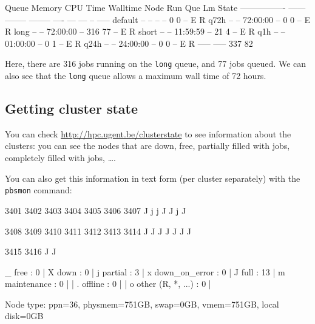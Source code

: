 \begin{prompt}
Queue            Memory CPU Time Walltime Node  Run Que Lm  State
---------------- ------ -------- -------- ----  --- --- --  -----
default            --      --       --      --    0   0 --   E R
q72h               --      --    72:00:00   --    0   0 --   E R
long               --      --    72:00:00   --  316  77 --   E R
short              --      --    11:59:59   --   21   4 --   E R
q1h                --      --    01:00:00   --    0   1 --   E R
q24h               --      --    24:00:00   --    0   0 --   E R
                                               ----- -----
                                                337  82
\end{prompt}

Here, there are 316 jobs running on the \lstinline|long| queue, and 77 jobs queued. We
can also see that the \lstinline|long| queue allows a maximum wall time of 72 hours.
\fi  %

\ifgent
\subsection{Getting cluster state}

You can check \url{http://hpc.ugent.be/clusterstate} to see information about
the clusters: you can see the nodes that are down, free, partially filled with jobs,
completely filled with jobs, \ldots.

You can also get this information in text form (per cluster separately) with
the \lstinline|pbsmon| command:


\begin{prompt}
 3401 3402 3403 3404 3405 3406 3407
    J    j    j    J    J    j    J

 3408 3409 3410 3411 3412 3413 3414
    J    J    J    J    J    J    J

 3415 3416
    J    J

   _ free                 : 0   |   X down                 : 0   |
   j partial              : 3   |   x down_on_error        : 0   |
   J full                 : 13  |   m maintenance          : 0   |
                                |   . offline              : 0   |
                                |   o other (R, *, ...)    : 0   |

Node type:
 ppn=36, physmem=751GB, swap=0GB, vmem=751GB, local disk=0GB
\end{prompt}

